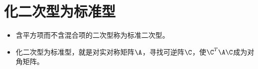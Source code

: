 \section{化二次型为标准型}

\begin{frame}
  \begin{footnotesize}
    \begin{itemize}
    \item 含平方项而不含混合项的二次型称为标准二次型。\\[0.2cm]
    \item 化二次型为标准型，就是对实对称矩阵$\A$，寻找可逆阵$\C$，使$\C^T\A\C$成为对角矩阵。
    \end{itemize}
  \end{footnotesize}
\end{frame}





